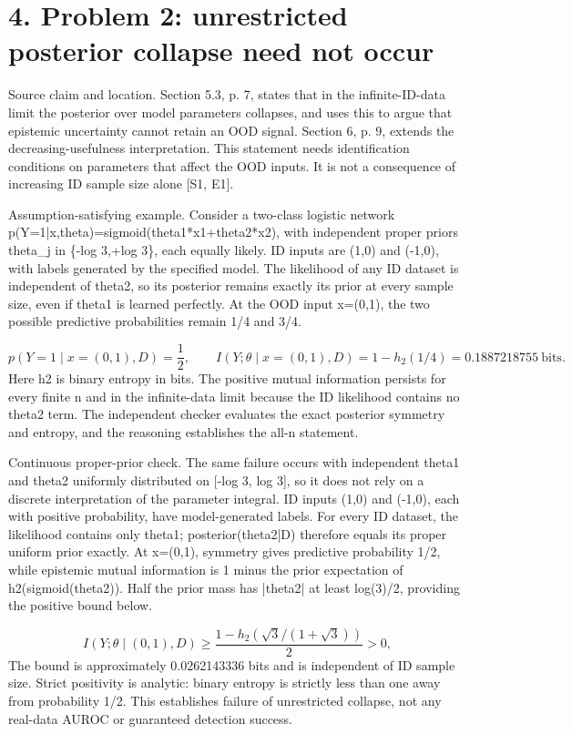 \documentclass[10pt]{article}
\begin{document}
\section*{4. Problem 2: unrestricted posterior collapse need not occur}
Source claim and location. Section 5.3, p. 7, states that in the infinite-ID-data limit the posterior over model parameters collapses, and uses this to argue that epistemic uncertainty cannot retain an OOD signal. Section 6, p. 9, extends the decreasing-usefulness interpretation. This statement needs identification conditions on parameters that affect the OOD inputs. It is not a consequence of increasing ID sample size alone [S1, E1].\par
Assumption-satisfying example. Consider a two-class logistic network p(Y=1|x,theta)=sigmoid(theta1*x1+theta2*x2), with independent proper priors theta\_j in \{-log 3,+log 3\}, each equally likely. ID inputs are (1,0) and (-1,0), with labels generated by the specified model. The likelihood of any ID dataset is independent of theta2, so its posterior remains exactly its prior at every sample size, even if theta1 is learned perfectly. At the OOD input x=(0,1), the two possible predictive probabilities remain 1/4 and 3/4.\par
\[p(Y=1\mid x=(0,1),D)=\frac12,\qquad I(Y;\theta\mid x=(0,1),D)=1-h_2(1/4)=0.1887218755\ \mathrm{bits}.\] Here h2 is binary entropy in bits. The positive mutual information persists for every finite n and in the infinite-data limit because the ID likelihood contains no theta2 term. The independent checker evaluates the exact posterior symmetry and entropy, and the reasoning establishes the all-n statement.\par
Continuous proper-prior check. The same failure occurs with independent theta1 and theta2 uniformly distributed on [-log 3, log 3], so it does not rely on a discrete interpretation of the parameter integral. ID inputs (1,0) and (-1,0), each with positive probability, have model-generated labels. For every ID dataset, the likelihood contains only theta1; posterior(theta2|D) therefore equals its proper uniform prior exactly. At x=(0,1), symmetry gives predictive probability 1/2, while epistemic mutual information is 1 minus the prior expectation of h2(sigmoid(theta2)). Half the prior mass has |theta2| at least log(3)/2, providing the positive bound below.\par
\[I(Y;\theta\mid (0,1),D)\geq \frac{1-h_2(\sqrt{3}/(1+\sqrt{3}))}{2}>0,\] The bound is approximately 0.0262143336 bits and is independent of ID sample size. Strict positivity is analytic: binary entropy is strictly less than one away from probability 1/2. This establishes failure of unrestricted collapse, not any real-data AUROC or guaranteed detection success.\par
\end{document}
